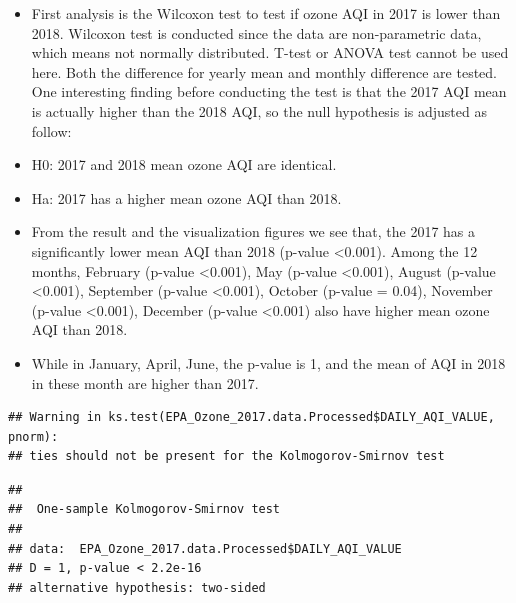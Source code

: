 \documentclass[12pt,]{article}
\newenvironment{Shaded}{\begin{snugshade}}{\end{snugshade}}
\newcommand{\KeywordTok}[1]{\textcolor[rgb]{0.13,0.29,0.53}{\textbf{#1}}}
\newcommand{\FloatTok}[1]{\textcolor[rgb]{0.00,0.00,0.81}{#1}}
\newcommand{\CommentTok}[1]{\textcolor[rgb]{0.56,0.35,0.01}{\textit{#1}}}
\newcommand{\OperatorTok}[1]{\textcolor[rgb]{0.81,0.36,0.00}{\textbf{#1}}}
\newcommand{\NormalTok}[1]{#1}
\begin{document}
\begin{itemize}
\item[] First analysis is the Wilcoxon test to test if ozone AQI in 2017 is lower than 2018. Wilcoxon test is conducted since the data are non-parametric data, which means not normally distributed. T-test or ANOVA test cannot be used here. Both the difference for yearly mean and monthly difference are tested. One interesting finding before conducting the test is that the 2017 AQI mean is actually higher than the 2018 AQI, so the null hypothesis is adjusted as follow:  
\item[]H0: 2017 and 2018 mean ozone AQI are identical.  \
\item[]Ha: 2017 has a higher mean ozone AQI than 2018.  \
\item[]From the result and the visualization figures we see that, the 2017 has a significantly lower mean AQI than 2018 (p-value <0.001). Among the 12 months, February (p-value <0.001), May (p-value <0.001), August (p-value <0.001), September (p-value <0.001), October (p-value = 0.04), November (p-value <0.001), December (p-value <0.001) also have higher mean ozone AQI than 2018.
\item[]While in January, April, June, the p-value is 1, and the mean of AQI in 2018 in these month are higher than 2017.
\end{itemize}

\begin{Shaded}
\end{Shaded}

\begin{verbatim}
## Warning in ks.test(EPA_Ozone_2017.data.Processed$DAILY_AQI_VALUE, pnorm):
## ties should not be present for the Kolmogorov-Smirnov test
\end{verbatim}

\begin{verbatim}
## 
##  One-sample Kolmogorov-Smirnov test
## 
## data:  EPA_Ozone_2017.data.Processed$DAILY_AQI_VALUE
## D = 1, p-value < 2.2e-16
## alternative hypothesis: two-sided
\end{verbatim}

\begin{Shaded}
\end{Shaded}
\end{document}
